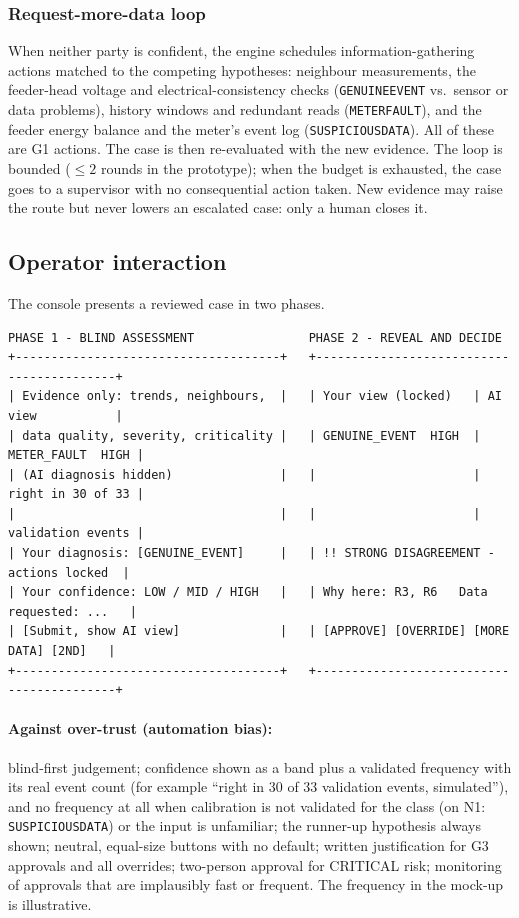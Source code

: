 \documentclass[11pt,a4paper]{article}
\renewcommand{\_}{\textunderscore\allowbreak}
\providecommand{\GE}{\texttt{GENUINE\_EVENT}}
\providecommand{\MF}{\texttt{METER\_FAULT}}
\providecommand{\SD}{\texttt{SUSPICIOUS\_DATA}}
\newcommand{\lvl}[1]{\textsf{#1}}
\begin{document}
\subsubsection{Request-more-data loop}
When neither party is confident, the engine schedules information-gathering actions matched to the competing
hypotheses: neighbour measurements, the feeder-head voltage and electrical-consistency checks (\GE{} vs.\
sensor or data problems), history windows and redundant reads (\MF), and the feeder energy balance and the
meter's event log (\SD). All of these are \lvl{G1} actions. The case is then re-evaluated with the new
evidence. The loop is bounded ($\le2$ rounds in the prototype); when the budget is exhausted, the case goes to
a supervisor with no consequential action taken. New evidence may raise the route but never lowers an
escalated case: only a human closes it.

\subsection{Operator interaction}
The console presents a reviewed case in two phases.

\begin{lstlisting}
PHASE 1 - BLIND ASSESSMENT                PHASE 2 - REVEAL AND DECIDE
+-------------------------------------+   +------------------------------------------+
| Evidence only: trends, neighbours,  |   | Your view (locked)   | AI view           |
| data quality, severity, criticality |   | GENUINE_EVENT  HIGH  | METER_FAULT  HIGH |
| (AI diagnosis hidden)               |   |                      | right in 30 of 33 |
|                                     |   |                      | validation events |
| Your diagnosis: [GENUINE_EVENT]     |   | !! STRONG DISAGREEMENT - actions locked  |
| Your confidence: LOW / MID / HIGH   |   | Why here: R3, R6   Data requested: ...   |
| [Submit, show AI view]              |   | [APPROVE] [OVERRIDE] [MORE DATA] [2ND]   |
+-------------------------------------+   +------------------------------------------+
\end{lstlisting}

\paragraph{Against over-trust (automation bias):} blind-first judgement; confidence shown as a band plus a
validated frequency with its real event count (for example ``right in 30 of 33 validation events, simulated''),
and no frequency at all when calibration is not validated for the class (on N1: \SD) or the input is
unfamiliar; the runner-up hypothesis always shown; neutral, equal-size buttons with no default; written
justification for \lvl{G3} approvals and all overrides; two-person approval for CRITICAL risk; monitoring of
approvals that are implausibly fast or frequent. The frequency in the mock-up is illustrative.
\end{document}
